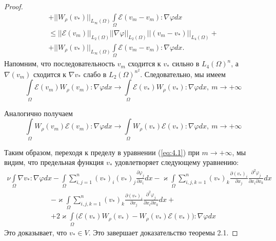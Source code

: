 \begin{proof}
\begin{equation*}
\begin{gathered}
            + ||W_\rho(v_*)||_{L_\infty(\Omega)} \int\limits_{\Omega}\mathcal{E}(v_m - v_m): \nabla\varphi dx\\
            \leq ||\mathcal{E}(v_m)||_{L_2(\Omega)}||\nabla\varphi||_{L_2(\Omega)}||(v_m - v_*)||_{L_4(\Omega)} +\\
            + ||W_\rho(v_*)||_{L_\infty(\Omega)} \int\limits_{\Omega}\mathcal{E}(v_m - v_m): \nabla\varphi dx.
        \end{gathered}
    \end{equation*}
    Напомним, что последовательность $v_m$ сходится к $v_*$ сильно в $L_4(\Omega)^n$,
    а $\nabla(v_m)$ сходится к $\nabla v_*$ слабо в $L_2(\Omega)^{n^2}$.
    Следовательно, мы имеем
    $$\int\limits_{\Omega}\mathcal{E}(v_m) W_\rho(v_m): \nabla\varphi dx \rightarrow
    \int\limits_{\Omega}\mathcal{E}(v_*) W_\rho(v_*): \nabla\varphi dx, \ m \rightarrow +\infty$$

    Аналогично получаем
    $$\int\limits_{\Omega}W_\rho(v_m)\mathcal{E}(v_m): \nabla\varphi dx \rightarrow
    \int\limits_{\Omega}W_\rho(v_*)\mathcal{E}(v_*): \nabla\varphi dx, \ m \rightarrow +\infty$$

    Таким образом, переходя к пределу в уравнении (\ref{eq:4.1}) при $m \rightarrow +\infty$,
    мы видим, что предельная функция $v_*$ удовлетворяет следующему уравнению:
    \begin{equation*}
        \begin{gathered}
            \nu\int\limits_{\Omega}\nabla v_*: \nabla\varphi dx -
            \int\limits_{\Omega}\sum_{i,j=1}^n (v_*)_i (v_*)_j \frac{\partial \varphi_j}{\partial x_i} dx
            - \varkappa \int\limits_{\Omega}\sum_{i,j,k=1}^n (v_*)_k \frac{\partial (v_*)_i}{\partial x_j}
            \frac{\partial^2 \varphi_j}{\partial x_i \partial x_k} dx
        \end{gathered}
    \end{equation*}
    \begin{equation*}
        \begin{gathered}
            - \varkappa \int\limits_{\Omega}\sum_{i,j,k=1}^n (v_*)_k \frac{\partial (v_*)_i}{\partial x_j}
            \frac{\partial^2 \varphi_j}{\partial x_i \partial x_k} dx + \\ + 2 \varkappa
            \int\limits_{\Omega}\bigg(\mathcal{E}(v_*) W_\rho(v_*) - W_\rho(v_*)\mathcal{E}(v_*)\bigg): \nabla\varphi dx
        \end{gathered}
    \end{equation*}
    Это доказывает, что $v_* \in V$. Это завершает доказательство теоремы 2.1.
\end{proof}

\begin{theorem}
    
\end{theorem}